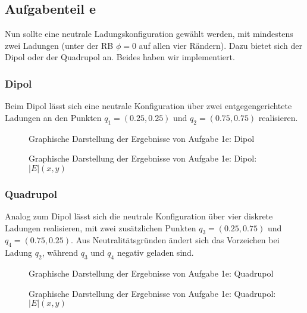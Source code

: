 \subsection*{Aufgabenteil e}
Nun sollte eine neutrale Ladungskonfiguration gewählt werden, mit mindestens zwei Ladungen (unter der RB $\phi = 0$ auf allen vier Rändern). Dazu bietet sich der Dipol oder der Quadrupol an. Beides haben wir implementiert.

\subsubsection*{Dipol}
Beim Dipol lässt sich eine neutrale Konfiguration über zwei entgegengerichtete Ladungen an den Punkten $q_1 = (0.25, 0.25)$ und $q_2 = (0.75,0.75)$ realisieren.

\begin{landscape}
	\begin{figure}
		\caption{Graphische Darstellung der Ergebnisse von Aufgabe 1e: Dipol}
		\label{fig:edipol}
	\end{figure}
\end{landscape} 


\begin{landscape}
	\begin{figure}
		\caption{Graphische Darstellung der Ergebnisse von Aufgabe 1e: Dipol: $|E|(x,y)$}
		\label{fig:edipolabse}
	\end{figure}
\end{landscape} 

\subsubsection*{Quadrupol}
Analog zum Dipol lässt sich die neutrale Konfiguration über vier diskrete Ladungen realisieren, mit zwei zusätzlichen Punkten $q_3 = (0.25,0.75)$ und $q_4 = (0.75,0.25)$. Aus Neutralitätsgründen ändert sich das Vorzeichen bei Ladung $q_2$, während $q_3$ und $q_4$ negativ geladen sind.

\begin{landscape}
	\begin{figure}
		\caption{Graphische Darstellung der Ergebnisse von Aufgabe 1e: Quadrupol}
		\label{fig:equad}
	\end{figure}
\end{landscape} 


\begin{landscape}
	\begin{figure}
		\caption{Graphische Darstellung der Ergebnisse von Aufgabe 1e: Quadrupol: $|E|(x,y)$}
		\label{fig:equadabse}
	\end{figure}
\end{landscape} 



